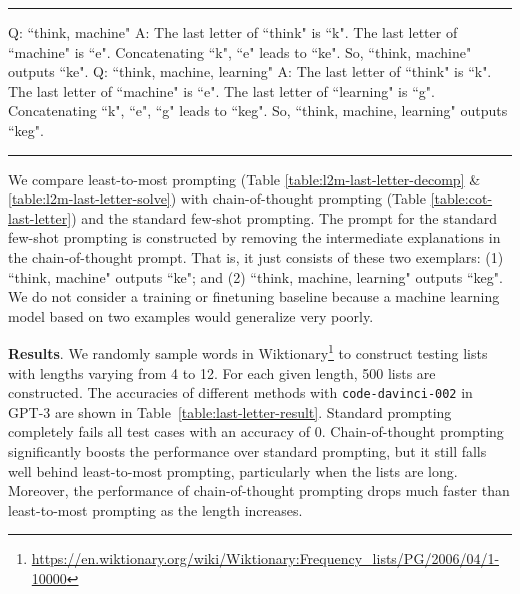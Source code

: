 \documentclass{article}
\begin{document}
\begin{table}[h!]
\centering
\hrule
\parbox{\textwidth}{
\vspace{5pt}
      Q: ``think, machine" \newline
        A: The last letter of ``think" is ``k". The last letter of ``machine" is ``e". Concatenating ``k", ``e" leads to ``ke". So, ``think, machine" outputs ``ke".\newline
        \newline
        Q: ``think, machine, learning"\newline
        A:  The last letter of ``think" is ``k". The last letter of ``machine" is ``e". The last letter of ``learning" is ``g".  Concatenating ``k", ``e", ``g" leads to ``keg". So, ``think, machine, learning" outputs ``keg".
\vspace{2pt}
}
\hrule
\vspace{5pt}
\caption {Chain-of-thought prompt context for the last-letter-concatenation task. Unlike the least-to-most prompt in Table \ref{table:l2m-last-letter-solve}, the exemplars in the chain-of-thought prompt are independent of each other.}
\label{table:cot-last-letter}
\end{table}

We compare least-to-most prompting (Table \ref{table:l2m-last-letter-decomp} \& \ref{table:l2m-last-letter-solve}) with chain-of-thought prompting (Table \ref{table:cot-last-letter}) and the standard few-shot prompting.  The prompt for the standard few-shot prompting is constructed by removing the intermediate explanations in the chain-of-thought prompt. That is, it just consists of these two exemplars:   (1) ``think, machine" outputs ``ke"; and (2) ``think, machine, learning" outputs 
``keg". We do not consider a training or finetuning baseline because a machine learning model based on two examples would generalize very poorly. 

\textbf{Results}. We randomly sample words in Wiktionary\footnote{\url{https://en.wiktionary.org/wiki/Wiktionary:Frequency_lists/PG/2006/04/1-10000}} to construct testing lists with lengths varying from 4 to 12. For each given length, 500 lists are constructed. The accuracies of different methods with \texttt{code-davinci-002} in GPT-3 are shown in Table~\ref{table:last-letter-result}. Standard prompting completely fails all test cases with an accuracy of 0. Chain-of-thought prompting significantly boosts the performance over standard prompting, but it still falls well behind least-to-most prompting, particularly when the lists are long. %
Moreover, the performance of chain-of-thought prompting drops much faster than least-to-most prompting as the length increases. 
\end{document}
